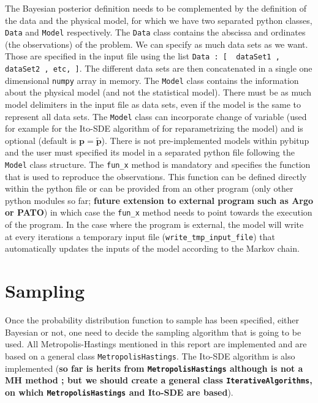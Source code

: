 \documentclass[a4paper,11pt]{article}
\begin{document}
The Bayesian posterior definition needs to be complemented by the definition of the data and the physical model, for which we have two separated python classes, \texttt{Data} and \texttt{Model} respectively. The \texttt{Data} class contains the abscissa and ordinates (the observations) of the problem. We can specify as much data sets as we want. Those are specified in the input file using the list \texttt{Data : [ { dataSet1 }, { dataSet2 }, etc, ]}. The different data sets are then concatenated in a single one dimensional \texttt{numpy} array in memory. The \texttt{Model} class contains the information about the physical model (and not the statistical model). There must be as much model delimiters in the input file as data sets, even if the model is the same to represent all data sets. The \texttt{Model} class can incorporate change of variable (used for example for the Ito-SDE algorithm of for reparametrizing the model) and is optional (default is $\mathbf{p} = \tilde{\mathbf{p}}$). There is not pre-implemented models within pybitup and the user must specified its model in a separated python file following the \texttt{Model} class structure. The \texttt{fun\_x} method is mandatory and specifies the function that is used to reproduce the observations. This function can be defined directly within the python file or can be provided from an other program (only other python modules so far; \textbf{future extension to external program such as Argo or PATO}) in which case the \texttt{fun\_x} method needs to point towards the execution of the program. In the case where the program is external, the model will write at every iterations a temporary input file (\texttt{write\_tmp\_input\_file}) that automatically updates the inputs of the model according to the Markov chain.



\section{Sampling}

Once the probability distribution function to sample has been specified, either Bayesian or not, one need to decide the sampling algorithm that is going to be used. All Metropolis-Hastings mentioned in this report are implemented and are based on a general class \texttt{MetropolisHastings}. The Ito-SDE algorithm is also implemented (\textbf{so far is herits from \texttt{MetropolisHastings} although is not a MH method ; but we should create a general class \texttt{IterativeAlgorithms}, on which \texttt{MetropolisHastings} and Ito-SDE are based}).
\end{document}
